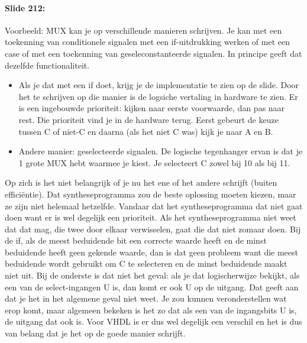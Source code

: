 \documentclass[10pt,a4paper]{book}
\begin{document}
\paragraph{Slide 212:} Voorbeeld: MUX kan je op verschillende manieren schrijven. Je  kan met een toekenning van conditionele signalen met een if-uitdrukking werken of met een case of met een toekenning van geseleconstanteerde signalen. In principe geeft dat dezelfde functionaliteit. 
\begin{itemize}
\item Als je dat met een if doet, krijg je de implementatie te zien op de slide. Door het te schrijven op die manier is de logsiche vertaling in hardware te zien. Er is een ingebouwde prioriteit: kijken naar eerste voorwaarde, dan pas naar rest. Die prioriteit vind je in de hardware terug. Eerst gebeurt de keuze tussen C of niet-C en daarna (als het niet C was) kijk je naar A en B.
\item Andere manier: geselecteerde signalen. De logische tegenhanger ervan is dat je 1 grote MUX hebt waarmee je kiest. Je selecteert C zowel bij 10 als bij 11.
\end{itemize}
Op zich is het niet belangrijk of je nu het ene of het andere schrijft (buiten effici\"entie). Dat syntheseprogramma zou de beste oplossing moeten kiezen, maar ze zijn niet helemaal hetzelfde. Vandaar dat het syntheseprogramma dat niet gaat doen want er is wel degelijk een prioriteit. Als het syntheseprogramma niet weet dat dat mag, die twee door elkaar verwisselen, gaat die dat niet zomaar doen. Bij de if, als de meest beduidende bit een correcte waarde heeft en de minst beduidende heeft geen gekende waarde, dan is dat geen probleem want die meest beduidende wordt gebruikt om C te selecteren en de minst beduidende maakt niet uit. Bij de onderste is dat niet het geval: als je dat logischerwijze bekijkt, als een van de select-ingangen U is, dan komt er ook U op de uitgang. Dat geeft aan dat je het in het algemene geval niet weet. Je zou kunnen veronderstellen wat erop komt, maar algemeen bekeken is het zo dat als een van de ingangsbits U is, de uitgang dat ook is. Voor VHDL is er dus wel degelijk een verschil en het is dus van belang dat je het op de goede manier schrijft. 
\end{document}
